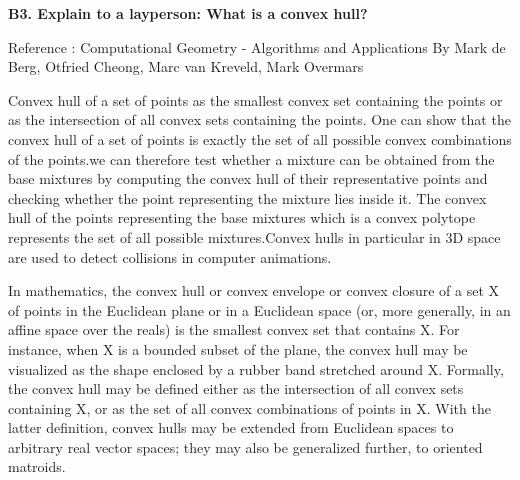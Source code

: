 \documentclass{article}[12pt]
\begin{document}
\vspace{2ex}\noindent
{ \bf B3. Explain to a layperson: What is a convex hull?  }
{
    
    Reference : Computational Geometry - Algorithms and Applications By Mark de Berg, Otfried Cheong, Marc van Kreveld, Mark Overmars
    
    Convex hull of a set of points as the smallest convex set containing the points or as the intersection of all convex sets containing the points. One can show that the convex hull of a set of points is exactly the set of all possible convex combinations of the points.we can therefore test whether a mixture can be obtained from the base mixtures by computing the convex hull of their representative points and checking whether the point representing the mixture lies inside it. The convex hull of the points representing the base mixtures which is a convex polytope represents the set of all possible mixtures.Convex hulls in particular in 3D space are used to detect collisions in computer animations.
    
    
    In mathematics, the convex hull or convex envelope or convex closure of a set X of points in the Euclidean plane or in a Euclidean space (or, more generally, in an affine space over the reals) is the smallest convex set that contains X. For instance, when X is a bounded subset of the plane, the convex hull may be visualized as the shape enclosed by a rubber band stretched around X. Formally, the convex hull may be defined either as the intersection of all convex sets containing X, or as the set of all convex combinations of points in X. With the latter definition, convex hulls may be extended from Euclidean spaces to arbitrary real vector spaces; they may also be generalized further, to oriented matroids.
}
\end{document}

